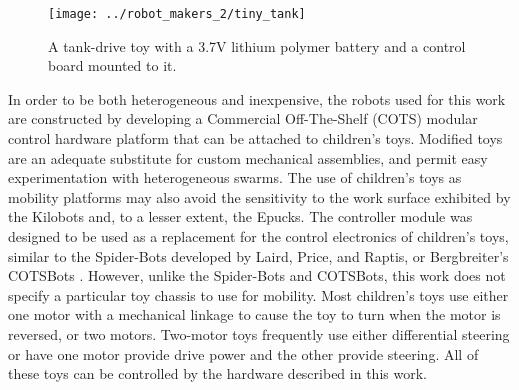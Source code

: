 
\begin{figure}
\centering
\texttt{[image: ../robot\_makers\_2/tiny\_tank]}
\caption{A tank-drive toy with a 3.7V lithium polymer battery and a control board mounted to it.}
\end{figure}

In order to be both heterogeneous and inexpensive, the robots used for this work are constructed by developing a Commercial Off-The-Shelf (COTS) modular control hardware platform that can be attached to children's toys. 
Modified toys are an adequate substitute for custom mechanical assemblies, and permit easy experimentation with heterogeneous swarms. 
The use of children's toys as mobility platforms may also avoid the sensitivity to the work surface exhibited by the Kilobots and, to a lesser extent, the Epucks.
The controller module was designed to be used as a replacement for the control electronics of children's toys, similar to the Spider-Bots developed by Laird, Price, and Raptis, or Bergbreiter's COTSBots \cite{lairdspider, bergbreiter2003cotsbots}.
However, unlike the Spider-Bots and COTSBots, this work does not specify a particular toy chassis to use for mobility. 
Most children's toys use either one motor with a mechanical linkage to cause the toy to turn when the motor is reversed, or two motors.
Two-motor toys frequently use either differential steering or have one motor provide drive power and the other provide steering. 
All of these toys can be controlled by the hardware described in this work. 

